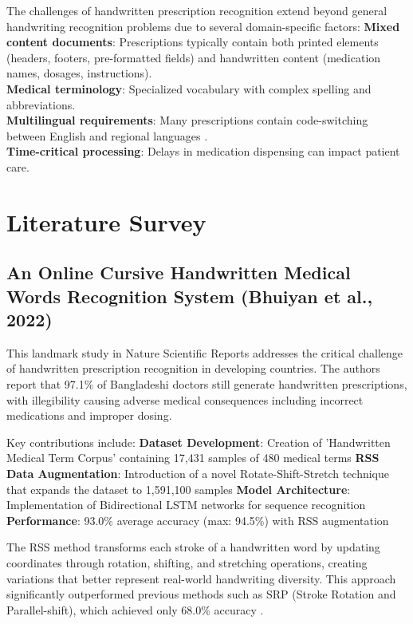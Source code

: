 \documentclass[twocolumn,10pt]{article}
\begin{document}
The challenges of handwritten prescription recognition extend beyond general handwriting recognition problems due to several domain-specific factors:
\textbf{Mixed content documents}: Prescriptions typically contain both printed elements (headers, footers, pre-formatted fields) and handwritten content (medication names, dosages, instructions).\\
\textbf{Medical terminology}: Specialized vocabulary with complex spelling and abbreviations.\\
\textbf{Multilingual requirements}: Many prescriptions contain code-switching between English and regional languages \cite{irjmets2024}.\\
\textbf{Time-critical processing}: Delays in medication dispensing can impact patient care.



\section{Literature Survey}

\subsection{An Online Cursive Handwritten Medical Words Recognition System (Bhuiyan et al., 2022)}
This landmark study in Nature Scientific Reports \cite{bhuiyan2022online} addresses the critical challenge of handwritten prescription recognition in developing countries. The authors report that 97.1\% of Bangladeshi doctors still generate handwritten prescriptions, with illegibility causing adverse medical consequences including incorrect medications and improper dosing.

Key contributions include:
\textbf{Dataset Development}: Creation of 'Handwritten Medical Term Corpus' containing 17,431 samples of 480 medical terms
\textbf{RSS Data Augmentation}: Introduction of a novel Rotate-Shift-Stretch technique that expands the dataset to 1,591,100 samples
\textbf{Model Architecture}: Implementation of Bidirectional LSTM networks for sequence recognition
\textbf{Performance}: 93.0\% average accuracy (max: 94.5\%) with RSS augmentation


The RSS method transforms each stroke of a handwritten word by updating coordinates through rotation, shifting, and stretching operations, creating variations that better represent real-world handwriting diversity. This approach significantly outperformed previous methods such as SRP (Stroke Rotation and Parallel-shift), which achieved only 68.0\% accuracy \cite{bhuiyan2022online}.
\end{document}
